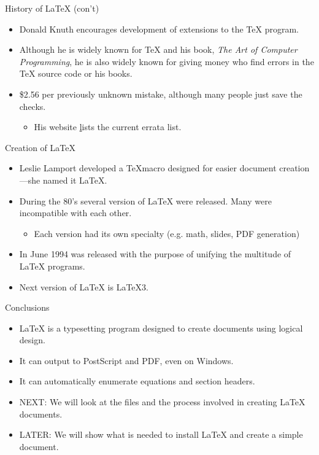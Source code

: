 \documentclass[pdf]{prosper}
\begin{document}
\begin{slide}{History of \LaTeX\mbox{} (con't)}
	\begin{itemize}
		\item Donald Knuth encourages development of extensions to the \TeX\mbox{} program.
		\item Although he is widely known for \TeX\mbox{} and his book, \textit{The Art of Computer Programming}, he is also widely known for giving money who find errors in the \TeX\mbox{} source code or his books.
		\item \$2.56 per previously unknown mistake, although many people just save the checks.
			\begin{itemize}
				\item His website \href{http://www-cs-faculty.stanford.edu/\~knuth} lists the current errata list.
			\end{itemize}
	\end{itemize}
\end{slide}
\begin{slide}{Creation of \LaTeX}
	\begin{itemize}
		\item Leslie Lamport developed a \TeX macro designed for easier document creation---she named it \LaTeX.
		\item During the 80's several version of \LaTeX\mbox{} were released. Many were incompatible with each other.
			\begin{itemize}
				\item Each version had its own specialty (e.g. math, slides, PDF generation)
			\end{itemize}
		\item In June 1994 \LaTeXe\mbox{} was released with the purpose of unifying the multitude of \LaTeX\mbox{} programs.
		\item Next version of \LaTeX\mbox{} is \LaTeX3.
	\end{itemize}
\end{slide}
\begin{slide}{Conclusions}
	\begin{itemize}
		\item \LaTeX\mbox{} is a typesetting program designed to create documents using logical design.
		\item It can output to PostScript and PDF, even on Windows.
		\item It can automatically enumerate equations and section headers.
		\item NEXT: We will look at the files and the process involved in creating \LaTeX\mbox{} documents.
		\item LATER: We will show what is needed to install \LaTeX\mbox{} and create a simple document.
	\end{itemize}
\end{slide}
\end{document}
